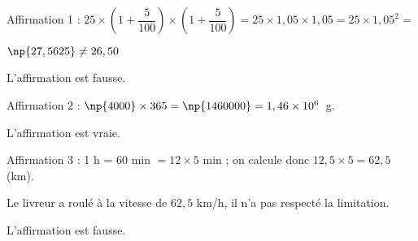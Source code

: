 
\medskip

Affirmation 1 : $25 \times \left(1 + \dfrac{5}{100}\right) \times \left(1 + \dfrac{5}{100}\right) = 25 \times 1,05 \times 1,05 = 25 \times 1,05^2 = $

$\np{27,5625} \ne 26,50$

L'affirmation est fausse.

Affirmation 2 : $\np{4000} \times 365 = \np{1460000} = 1,46\times 10^6$~g.

L'affirmation est vraie.

Affirmation 3 : 1 h = 60 min $= 12  \times 5$ min ;  on calcule donc $12,5  \times 5 = 62,5$ (km).

Le livreur a roulé à la vitesse de $62,5$ km/h, il n'a pas respecté la limitation.

L'affirmation est fausse.

\vspace{0,5cm}

